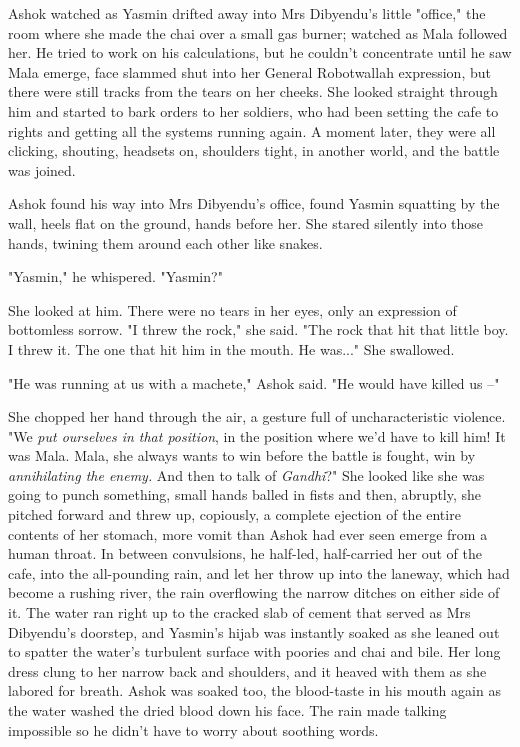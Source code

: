 Ashok watched as Yasmin drifted away into Mrs Dibyendu's little
"office," the room where she made the chai over a small gas burner;
watched as Mala followed her. He tried to work on his calculations,
but he couldn't concentrate until he saw Mala emerge, face slammed
shut into her General Robotwallah expression, but there were still
tracks from the tears on her cheeks. She looked straight through
him and started to bark orders to her soldiers, who had been
setting the cafe to rights and getting all the systems running
again. A moment later, they were all clicking, shouting, headsets
on, shoulders tight, in another world, and the battle was joined.

Ashok found his way into Mrs Dibyendu's office, found Yasmin
squatting by the wall, heels flat on the ground, hands before her.
She stared silently into those hands, twining them around each
other like snakes.

"Yasmin," he whispered. "Yasmin?"

She looked at him. There were no tears in her eyes, only an
expression of bottomless sorrow. "I threw the rock," she said. "The
rock that hit that little boy. I threw it. The one that hit him in
the mouth. He was..." She swallowed.

"He was running at us with a machete," Ashok said. "He would have
killed us --"

She chopped her hand through the air, a gesture full of
uncharacteristic violence. "We
\emph{put ourselves in that position}, in the position where we'd
have to kill him! It was Mala. Mala, she always wants to win before
the battle is fought, win by \emph{annihilating the enemy.} And
then to talk of \emph{Gandhi}?" She looked like she was going to
punch something, small hands balled in fists and then, abruptly,
she pitched forward and threw up, copiously, a complete ejection of
the entire contents of her stomach, more vomit than Ashok had ever
seen emerge from a human throat. In between convulsions, he
half-led, half-carried her out of the cafe, into the all-pounding
rain, and let her throw up into the laneway, which had become a
rushing river, the rain overflowing the narrow ditches on either
side of it. The water ran right up to the cracked slab of cement
that served as Mrs Dibyendu's doorstep, and Yasmin's hijab was
instantly soaked as she leaned out to spatter the water's turbulent
surface with poories and chai and bile. Her long dress clung to her
narrow back and shoulders, and it heaved with them as she labored
for breath. Ashok was soaked too, the blood-taste in his mouth
again as the water washed the dried blood down his face. The rain
made talking impossible so he didn't have to worry about soothing
words.

